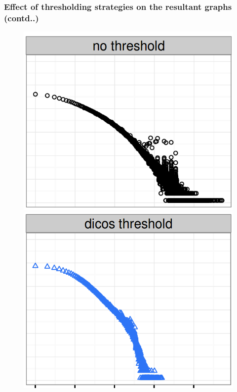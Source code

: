 \documentclass[10pt, compress]{beamer}
\begin{document}
\begin{frame}[fragile]
	\frametitle{\normalsize Effect of thresholding strategies on the resultant graphs {\small (contd..)}}
\begin{figure}
\begin{minipage}{0.32\linewidth}
	\centering
    \includegraphics[width=\textwidth]{no-threshold-pdf.png}
\end{minipage}
\hfill
\begin{minipage}{0.32\linewidth}
	\centering
    \includegraphics[width=\textwidth]{dicos-pdf.png}

\end{minipage}
\end{figure}
\end{frame}
\end{document}
